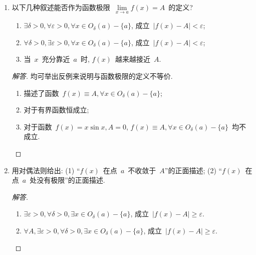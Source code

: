 \documentclass[UTF8,a4paper,11pt,twoside]{book}
\begin{document}
\begin{enumerate}
\begin{proof}[解答]
\begin{enumerate}[(1)]
			            $\Leftarrow$~由于~$\lim\limits_{n\to\infty} \dfrac{1}{n}=0$, 故对于~$\forall\delta>0, \exists n_0\in\mathbf{N}_{+}$~使得~$\dfrac{1}{n}<\delta$. $\forall\varepsilon>0, \exists\delta>0, \forall x\in O_{\delta}(a)-\{a\}$, 成立~$|f(x)-A|<\varepsilon$. 取合适的~$n_0$~使得~$\dfrac{1}{n_0}<\delta$, 则对于~$\forall x\in O_{\frac{1}{n}}(a)-\{a\}\subset O_{\delta}(a)-\{a\}$, 成立~$|f(x)-A|<\varepsilon$. \qedhere
		      \end{enumerate}
	      \end{proof}
	\item 以下几种叙述能否作为函数极限~$\lim\limits_{x\to a} f(x)=A$~的定义?
	      \begin{enumerate}[(1)]
		      \item $\exists\delta>0, \forall\varepsilon>0, \forall x\in O_{\delta}(a)-\{a\}$, 成立~$|f(x)-A|<\varepsilon$;
		      \item $\forall\delta>0, \exists\varepsilon>0, \forall x\in O_{\delta}(a)-\{a\}$, 成立~$|f(x)-A|<\varepsilon$;
		      \item 当~$x$~充分靠近~$a$~时, $f(x)$~越来越接近~$A$.
	      \end{enumerate}
	      \begin{proof}[解答]
		      均可举出反例来说明与函数极限的定义不等价.
		      \begin{enumerate}[(1)]
			      \item 描述了函数~$f(x)\equiv A, \forall x\in O_{\delta}(a)-\{a\}$;
			      \item 对于有界函数恒成立;
			      \item 对于函数~$f(x)=x\sin{x}, A=0$, $f(x)\equiv A, \forall x\in O_{\delta}(a)-\{a\}$~均不成立. \qedhere
		      \end{enumerate}
	      \end{proof}

	\item 用对偶法则给出: (1) ``$f(x)$~在点~$a$~不收敛于~$A$''的正面描述; (2) ``$f(x)$~在点~$a$~处没有极限''的正面描述.
	      \begin{proof}[解答]
		      \begin{enumerate}[(1)]
			      \item $\exists\varepsilon>0, \forall \delta>0, \exists x\in O_{\delta}(a)-\{a\}$, 成立~$|f(x)-A|\geqslant\varepsilon$.
			      \item $\forall A, \exists\varepsilon>0, \forall \delta>0, \exists x\in O_{\delta}(a)-\{a\}$, 成立~$|f(x)-A|\geqslant\varepsilon$.
		      \end{enumerate}
	      \end{proof}


\end{enumerate}
\end{document}
